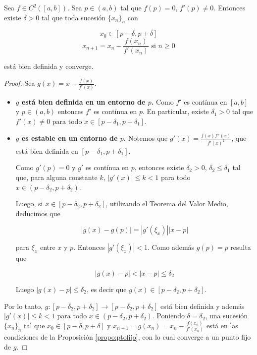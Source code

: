 \begin{propo}
Sea $f \in C^2([a, b])$. Sea $p \in (a, b)$ tal que $f(p) = 0$, $f'(p) \neq 0$. Entonces existe $\delta > 0$ tal que toda sucesión $\{x_n\}_n$ con

\[x_0 \in [p - \delta, p + \delta]\]
\[x_{n + 1} = x_n - \frac{f(x_n)}{f'(x_n)} \text{ si } n \geq 0\]

está bien definida y converge.

\begin{proof}
Sea $g(x) = x - \frac{f(x)}{f'(x)}$.

\begin{itemize}
\item \textbf{$g$ está bien definida en un entorno de $p$.} Como $f'$ es contínua en $[a, b]$ y $p \in (a, b)$ entonces $f'$ es contínua en $p$. En particular, existe $\delta_1 > 0$ tal que $f'(x) \neq 0$ para todo $x \in [p - \delta_1, p + \delta_1]$.

\item \textbf{$g$ es estable en un entorno de $p$.} Notemos que $g'(x) = \frac{f(x)f''(x)}{f'(x)^2}$, que está bien definida en $[p - \delta_1, p + \delta_1]$.

Como $g'(p) = 0$ y $g'$ es contínua en $p$, entonces existe $\delta_2 > 0$, $\delta_2 \leq \delta_1$ tal que, para alguna constante $k$, $|g'(x)| \leq k < 1$ para todo $x \in (p - \delta_2, p + \delta_2)$.
 
Luego, si $x \in [p - \delta_2, p + \delta_2]$, utilizando el Teorema del Valor Medio, deducimos que

\[|g(x) - g(p)| = \left|g'(\xi_x)\right| \left| x - p \right|\]

para $\xi_x$ entre $x$ y $p$. Entonces $|g'(\xi_x)| < 1$. Como además $g(p) = p$ resulta que

\[|g(x) - p| < |x - p| \leq \delta_2\]

Luego $|g(x) - p| \leq \delta_2$, es decir que $g(x) \in [p - \delta_2, p + \delta_2]$.

\end{itemize}

Por lo tanto, $g: [p - \delta_2, p + \delta_2] \to [p - \delta_2, p + \delta_2]$ está bien definida y además $|g'(x)| \leq k < 1$ para todo $x \in (p - \delta_2, p + \delta_2)$. Poniendo $\delta = \delta_2$, una sucesión $\{x_n\}_n$ tal que $x_0 \in [p - \delta, p + \delta]$ y $x_{n + 1} = g(x_n) = x_n - \frac{f(x_n)}{f'(x_n)}$ está en las condiciones de la Proposición \ref{propo:ptofijo}, con lo cual converge a un punto fijo de $g$.

\end{proof}
\end{propo}

